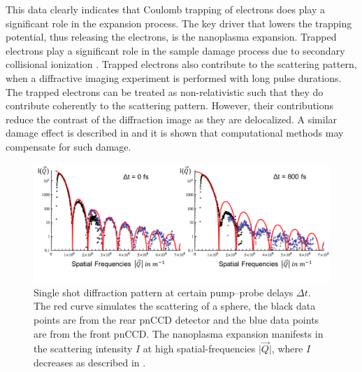 This data clearly indicates that Coulomb trapping of electrons does play a significant role in the expansion process. The key driver that lowers the trapping potential, thus releasing the electrons, is the nanoplasma expansion. Trapped electrons play a significant role in the sample damage process due to secondary collisional ionization \cite{Hau-Riege-2004-PRE}.
%
Trapped electrons also contribute to the scattering pattern, when a diffractive imaging experiment is performed with long pulse durations. The trapped electrons can be treated as non-relativistic such that they do contribute coherently to the scattering pattern. However, their contributions reduce the contrast of the diffraction image as they are delocalized. A similar damage effect is described in \citep{Quiney-2010-NatPhys} and it is shown that computational methods may compensate for such damage.\\[1\baselineskip]
%
%
%
\begin{figure}
	\centering
		\includegraphics[width=1.0\textwidth]{images/results/Xe-diff-pattern.png}
	\caption[Single-shot diffraction pattern of Xe-cluster at varying time delays]{Single shot diffraction pattern at certain pump--probe delays $\Delta t$. The red curve simulates the scattering of a sphere, the black data points are from the rear pnCCD detector and the blue data points are from the front pnCCD. The nanoplasma expansion manifests in the scattering intensity $I$ at high spatial-frequencies $\lvert \vec{Q}\rvert$, where $I$ decreases as described in \citep{Gorkhover-2016-NatPho}.}
	\label{fig:Xe-only-diff-pattern}
\end{figure}
